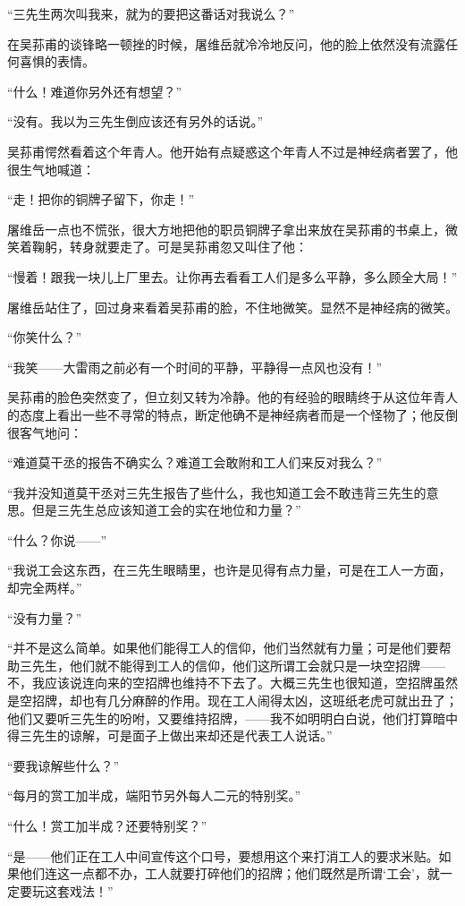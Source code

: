 \par “三先生两次叫我来，就为的要把这番话对我说么？”
\par 在吴荪甫的谈锋略一顿挫的时候，屠维岳就冷冷地反问，他的脸上依然没有流露任何喜惧的表情。
\par “什么！难道你另外还有想望？”
\par “没有。我以为三先生倒应该还有另外的话说。”
\par 吴荪甫愕然看着这个年青人。他开始有点疑惑这个年青人不过是神经病者罢了，他很生气地喊道：
\par “走！把你的铜牌子留下，你走！”
\par 屠维岳一点也不慌张，很大方地把他的职员铜牌子拿出来放在吴荪甫的书桌上，微笑着鞠躬，转身就要走了。可是吴荪甫忽又叫住了他：
\par “慢着！跟我一块儿上厂里去。让你再去看看工人们是多么平静，多么顾全大局！”
\par 屠维岳站住了，回过身来看着吴荪甫的脸，不住地微笑。显然不是神经病的微笑。
\par “你笑什么？”
\par “我笑——大雷雨之前必有一个时间的平静，平静得一点风也没有！”
\par 吴荪甫的脸色突然变了，但立刻又转为冷静。他的有经验的眼睛终于从这位年青人的态度上看出一些不寻常的特点，断定他确不是神经病者而是一个怪物了；他反倒很客气地问：
\par “难道莫干丞的报告不确实么？难道工会敢附和工人们来反对我么？”
\par “我并没知道莫干丞对三先生报告了些什么，我也知道工会不敢违背三先生的意思。但是三先生总应该知道工会的实在地位和力量？”
\par “什么？你说——”
\par “我说工会这东西，在三先生眼睛里，也许是见得有点力量，可是在工人一方面，却完全两样。”
\par “没有力量？”
\par “并不是这么简单。如果他们能得工人的信仰，他们当然就有力量；可是他们要帮助三先生，他们就不能得到工人的信仰，他们这所谓工会就只是一块空招牌——不，我应该说连向来的空招牌也维持不下去了。大概三先生也很知道，空招牌虽然是空招牌，却也有几分麻醉的作用。现在工人闹得太凶，这班纸老虎可就出丑了；他们又要听三先生的吩咐，又要维持招牌，——我不如明明白白说，他们打算暗中得三先生的谅解，可是面子上做出来却还是代表工人说话。”
\par “要我谅解些什么？”
\par “每月的赏工加半成，端阳节另外每人二元的特别奖。”
\par “什么！赏工加半成？还要特别奖？”
\par “是——他们正在工人中间宣传这个口号，要想用这个来打消工人的要求米贴。如果他们连这一点都不办，工人就要打碎他们的招牌；他们既然是所谓‘工会’，就一定要玩这套戏法！”
